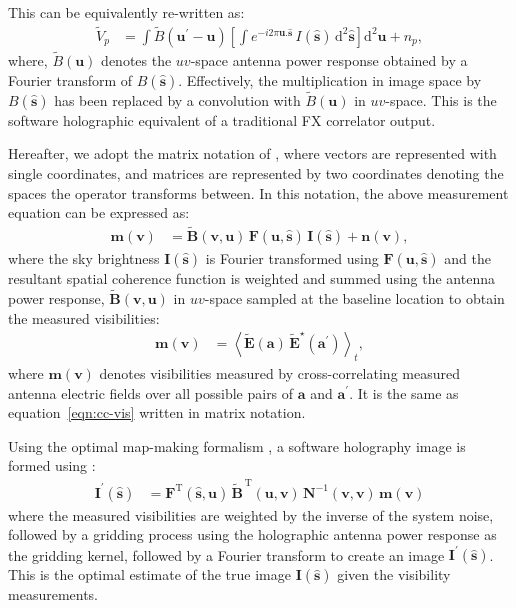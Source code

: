 \documentclass[a4paper,fleqn,usenatbib]{mnras}
\newcommand{\dif}{\mathrm{d}}
\begin{document}
This can be equivalently re-written as:
\begin{align}\label{eqn:software-holography}
  \widetilde{V}_p &= \int \widetilde{B}(\mathbf{u}^\prime-\mathbf{u}) \left[\int e^{-i2\pi\mathbf{u}.\hat{\mathbf{s}}}\,I(\hat{\mathbf{s}})\,\dif^2\hat{\mathbf{s}}\right]\dif^2\mathbf{u} + n_p,
\end{align}
where, $\widetilde{B}(\mathbf{u})$ denotes the $uv$-space antenna power response
obtained by a Fourier transform of $B(\hat{\mathbf{s}})$. Effectively, the
multiplication in image space by $B(\hat{\mathbf{s}})$ has been replaced by a
convolution with $\widetilde{B}(\mathbf{u})$ in $uv$-space. This is the software
holographic equivalent of a traditional FX correlator output. 

Hereafter, we adopt the matrix notation of \citet{mor11}, where vectors are 
represented with single coordinates, and matrices are represented by two 
coordinates denoting the spaces the operator transforms between. 
In this notation, the above measurement equation can be expressed as:
\begin{align}
  \mathbf{m}(\mathbf{v}) &= \widetilde{\mathbf{B}}(\mathbf{v},\mathbf{u})\,\mathbf{F}(\mathbf{u},\hat{\mathbf{s}})\,\mathbf{I}(\hat{\mathbf{s}}) + \mathbf{n}(\mathbf{v}),
\end{align}
where the sky brightness $\mathbf{I}(\hat{\mathbf{s}})$ is Fourier transformed using
$\mathbf{F}(\mathbf{u},\hat{\mathbf{s}})$ and the resultant spatial coherence
function is weighted and summed using the antenna power response,
$\widetilde{\mathbf{B}}(\mathbf{v},\mathbf{u})$ in $uv$-space sampled at the baseline
location to obtain the measured visibilities:
\begin{align}
  \mathbf{m}(\mathbf{v}) &= \left\langle \widetilde{\mathbf{E}}(\mathbf{a})\,\widetilde{\mathbf{E}}^\star(\mathbf{a}^\prime)\right\rangle_t, \label{eqn:matrix-cc-vis}
\end{align}
where $\mathbf{m}(\mathbf{v})$ denotes visibilities measured by cross-correlating
measured antenna electric fields over all possible pairs of $\mathbf{a}$ and
$\mathbf{a}^\prime$. It is the same as equation~\ref{eqn:cc-vis} written in
matrix notation.

Using the optimal map-making formalism \citep{teg97a,teg97b}, a software
holography image is formed using \citep{mor09}:
\begin{align}
  \mathbf{I}^\prime(\hat{\mathbf{s}}) &= \mathbf{F}^\textrm{T}(\hat{\mathbf{s}},\mathbf{u})\,\widetilde{\mathbf{B}}^{\,\textrm{T}}(\mathbf{u},\mathbf{v})\,\mathbf{N}^{-1}(\mathbf{v},\mathbf{v})\,\mathbf{m}(\mathbf{v}) \label{eqn:dirty-image-FX}
\end{align}
where the measured visibilities are weighted by the inverse of the system noise,
followed by a gridding process using the holographic antenna power response as 
the gridding kernel, followed by a Fourier transform to create an image
$\mathbf{I}^\prime(\hat{\mathbf{s}})$. This is the optimal estimate of the true 
image $\mathbf{I}(\hat{\mathbf{s}})$ given the visibility measurements.
\end{document}
